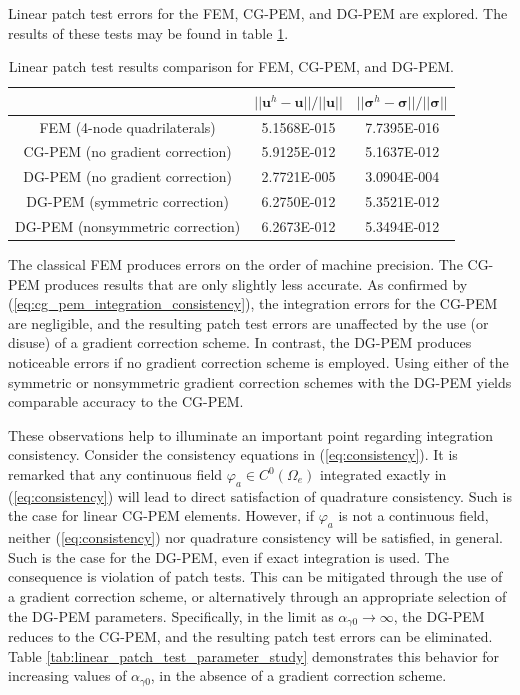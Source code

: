 Linear patch test errors for the FEM, CG-PEM, and DG-PEM are explored. The results of these tests may be found in table \ref{tab:linear_patch_test}.

\begin{table}[!ht]
  \begin{center}
    \begin{tabular}{| c || c | c |}
    \hline
           & $||\mathbf{u}^h - \mathbf{u}|| / ||\mathbf{u}||$ & $||\boldsymbol{\sigma}^h - \boldsymbol{\sigma}|| / ||\boldsymbol{\sigma}||$ \\ \hline \hline
    FEM (4-node quadrilaterals) & 5.1568E-015 & 7.7395E-016 \\ \hline
    CG-PEM (no gradient correction) & 5.9125E-012 & 5.1637E-012 \\ \hline
    DG-PEM (no gradient correction) & 2.7721E-005 & 3.0904E-004 \\ \hline
    DG-PEM (symmetric correction) & 6.2750E-012 & 5.3521E-012 \\ \hline
    DG-PEM (nonsymmetric correction) & 6.2673E-012 & 5.3494E-012 \\
    \hline
    \end{tabular}
    \caption{Linear patch test results comparison for FEM, CG-PEM, and DG-PEM.}
    \vspace{-5pt}
    \label{tab:linear_patch_test}
    \vspace{-10pt}
  \end{center}
\end{table}

The classical FEM produces errors on the order of machine precision. The CG-PEM produces results that are only slightly less accurate. As confirmed by (\ref{eq:cg_pem_integration_consistency}), the integration errors for the CG-PEM are negligible, and the resulting patch test errors are unaffected by the use (or disuse) of a gradient correction scheme. In contrast, the DG-PEM produces noticeable errors if no gradient correction scheme is employed. Using either of the symmetric or nonsymmetric gradient correction schemes with the DG-PEM yields comparable accuracy to the CG-PEM.

These observations help to illuminate an important point regarding integration consistency. Consider the consistency equations in (\ref{eq:consistency}). It is remarked that any continuous field $\varphi_a \in C^0 (\Omega_e)$ integrated exactly in (\ref{eq:consistency}) will lead to direct satisfaction of quadrature consistency. Such is the case for linear CG-PEM elements. However, if $\varphi_a$ is not a continuous field, neither (\ref{eq:consistency}) nor quadrature consistency will be satisfied, in general. Such is the case for the DG-PEM, even if exact integration is used. The consequence is violation of patch tests. This can be mitigated through the use of a gradient correction scheme, or alternatively through an appropriate selection of the DG-PEM parameters. Specifically, in the limit as $\alpha_{\gamma0} \rightarrow \infty$, the DG-PEM reduces to the CG-PEM, and the resulting patch test errors can be eliminated. Table \ref{tab:linear_patch_test_parameter_study} demonstrates this behavior for increasing values of $\alpha_{\gamma0}$, in the absence of a gradient correction scheme.

